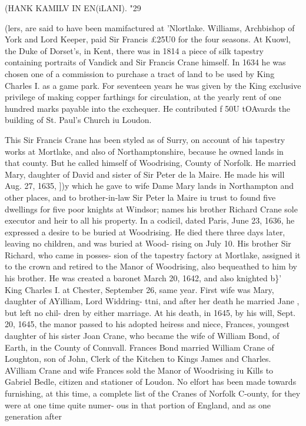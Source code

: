 \documentclass{book}
\begin{document}
(HANK KAMILV IN EN(iLANI). "29 

(lers, are said to have been mamifactured at 'Nlortlake. Williams, 
Archbishop of York and Lord Keeper, paid Sir Francis £25U0 
for the four seasons. At Kuowl, the Duke of Dorset's, in Kent, 
there was in 1814 a piece of silk tapestry containing portraits of 
Vandick and Sir Francis Crane himself. In 1634 he was chosen 
one of a commission to purchase a tract of land to be used by 
King Charles I. as a game park. For seventeen years he was 
given by the King exclusive privilege of making copper farthings 
for circulation, at the yearly rent of one hundred marks payable 
into the exchequer. He contributed f 50U tOAvards the building 
of St. Paul's Church iu Loudon. 

This Sir Francis Crane has been styled as of Surry, on account 
of his tapestry works at Mortlake, and also of Northamptonshire, 
because he owned lands in that county. But he called himself of 
Woodrising, County of Norfolk. He married Mary, daughter of 
David and sister of Sir Peter de la Maire. He made his will 
Aug. 27, 1635, ])y which he gave to wife Dame Mary lands in 
Northampton and other places, and to brother-in-law Sir Peter la 
Maire iu trust to found five dwellings for five poor knights at 
Windsor; names his brother Richard Crane sole executor and 
heir to all his property. In a codicil, dated Paris, June 23, 1636, 
he expressed a desire to be buried at Woodrising. He died there 
three days later, leaving no children, and was buried at Wood- 
rising on July 10. His brother Sir Richard, who came in posses- 
sion of the tapestry factory at Mortlake, assigned it to the crown 
and retired to the Manor of Woodrising, also bequeathed to him 
by his brother. He was created a baronet March 20, 1642, and 
also knighted b\}' King Charles I. at Chester, September 26, same 
year. First wife was Mary, daughter of AYilliam, Lord Widdring- 
ttni, and after her death he married Jane , but left no chil- 
dren by either marriage. At his death, in 1645, by his will, 
Sept. 20, 1645, the manor passed to his adopted heiress and niece, 
Frances, youngest daughter of his sister Joan Crane, who became 
the wife of William Bond, of Earth, in the County of Connvall. 
Frances Bond married William Crane of Loughton, son of John, 
Clerk of the Kitchen to Kings James and Charles. AVilliam 
Crane and wife Frances sold the Manor of Woodrising iu Kills to 
Gabriel Bedle, citizen and stationer of Loudon. No elfort has 
been made towards furnishing, at this time, a complete list of the 
Cranes of Norfolk C-ounty, for they were at one time quite numer- 
ous in that portion of England, and as one generation after 
\end{document}
